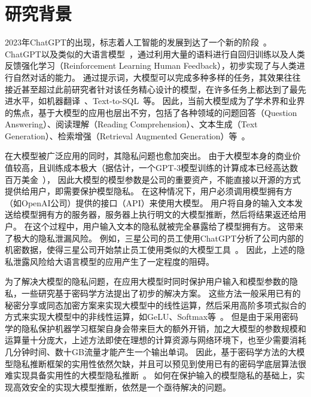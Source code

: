 \section{研究背景}
2023年ChatGPT的出现，标志着人工智能的发展到达了一个新的阶段~\cite{chatgpt}。
%
ChatGPT以及类似的大语言模型~\cite{touvron_2023_llama,zeng_2022_glm130b,jiang_2023_mistral,2023_gemini}，通过利用大量的语料进行自回归训练以及人类反馈强化学习（Reinforcement Learning Human Feedback），初步实现了与人类进行自然对话的能力。
%
通过提示词，大模型可以完成多种多样的任务，其效果往往接近甚至超过此前研究者针对该任务精心设计的模型，在许多任务上都达到了最先进水平，如机器翻译~\cite{jiaowenxiang_2023_llm_translation}、Text-to-SQL~\cite{gaodawei_2024_text2sql_llm}等。
%
因此，当前大模型成为了学术界和业界的焦点，基于大模型的应用也层出不穷，包括了各种领域的问题回答（Question Answering）、阅读理解（Reading Comprehension）、文本生成（Text Generation）、检索增强（Retrieval Augmented Generation）等~\cite{zhao_2023_llm_survey}。


在大模型被广泛应用的同时，其隐私问题也愈加突出。
%
由于大模型本身的商业价值较高，且训练成本极大（据估计，一个GPT-3模型训练的计算成本已经高达数百万美金~\cite{gpt3_technical_report}），
因此大模型的模型参数是公司的重要资产，不能直接以开源的方式提供给用户，即需要保护模型隐私。
%
在这种情况下，用户必须调用模型拥有方（如OpenAI公司）提供的接口（API）来使用大模型。
%
用户将自身的输入文本发送给模型拥有方的服务器，服务器上执行明文的大模型推断，然后将结果返还给用户。
%
在这个过程中，用户输入文本的隐私就被完全暴露给了模型拥有方。
%
这带来了极大的隐私泄漏风险。
%
例如，三星公司的员工使用ChatGPT分析了公司内部的机密数据，使得三星公司开始禁止员工使用类似的大模型工具~\cite{samsung_chatgpt_leak}。
%
因此，上述的隐私泄露风险给大语言模型的应用产生了一定程度的阻碍。


为了解决大模型的隐私问题，在应用大模型时同时保护用户输入和模型参数的隐私，一些研究基于密码学方法提出了初步的解决方案。
%
这些方法一般采用已有的秘密分享或同态加密方案来实现大模型中的线性运算，然后采用高阶多项式拟合的方式来实现大模型中的非线性运算，如GeLU、Softmax等~\cite{pang_2024_bolt_transformer,hou2023ciphergpt,dong2023puma,lu2023bumblebee}。
%
但是由于采用密码学的隐私保护机器学习框架自身会带来巨大的额外开销，加之大模型的参数规模和运算量十分庞大，上述方法即使在理想的计算资源与网络环境下，也至少需要消耗几分钟时间、数十GB流量才能产生一个输出单词。
%
因此，基于密码学方法的大模型隐私推断框架的实用性依然欠缺，并且可以预见到使用已有的密码学底层算法很难实现具备实用性的大模型隐私推断~\cite{hou2023ciphergpt}。
%
如何在保护输入的模型隐私的基础上，实现高效安全的实现大模型推断，依然是一个亟待解决的问题。
